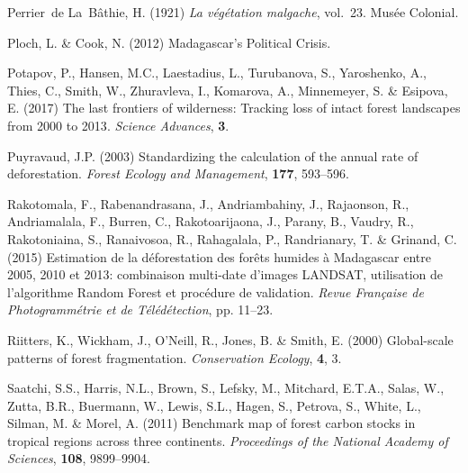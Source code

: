 \documentclass[a4paper, 12pt, leqno]{article} %
\begin{document}
\begin{thebibliography}{55}
Perrier~de La~B{\^a}thie, H. (1921) \emph{{La v{\'e}g{\'e}tation malgache}},
  vol.~23.
\newblock Mus{\'e}e Colonial.

Ploch, L. \& Cook, N. (2012) {Madagascar's Political Crisis}.

Potapov, P., Hansen, M.C., Laestadius, L., Turubanova, S., Yaroshenko, A.,
  Thies, C., Smith, W., Zhuravleva, I., Komarova, A., Minnemeyer, S. \&
  Esipova, E. (2017) {The last frontiers of wilderness: Tracking loss of intact
  forest landscapes from 2000 to 2013}.
\newblock \emph{Science Advances}, \textbf{3}.

Puyravaud, J.P. (2003) Standardizing the calculation of the annual rate of
  deforestation.
\newblock \emph{Forest Ecology and Management}, \textbf{177}, 593--596.

Rakotomala, F., Rabenandrasana, J., Andriambahiny, J., Rajaonson, R.,
  Andriamalala, F., Burren, C., Rakotoarijaona, J., Parany, B., Vaudry, R.,
  Rakotoniaina, S., Ranaivosoa, R., Rahagalala, P., Randrianary, T. \& Grinand,
  C. (2015) {Estimation de la d{\'e}forestation des for{\^e}ts humides {\`a}
  Madagascar entre 2005, 2010 et 2013: combinaison multi-date d'images LANDSAT,
  utilisation de l'algorithme Random Forest et proc{\'e}dure de validation}.
\newblock \emph{Revue Fran{\c{c}}aise de Photogramm{\'e}trie et de
  T{\'e}l{\'e}d{\'e}tection}, pp. 11--23.

Riitters, K., Wickham, J., O'Neill, R., Jones, B. \& Smith, E. (2000)
  Global-scale patterns of forest fragmentation.
\newblock \emph{Conservation Ecology}, \textbf{4}, 3.

Saatchi, S.S., Harris, N.L., Brown, S., Lefsky, M., Mitchard, E.T.A., Salas,
  W., Zutta, B.R., Buermann, W., Lewis, S.L., Hagen, S., Petrova, S., White,
  L., Silman, M. \& Morel, A. (2011) Benchmark map of forest carbon stocks in
  tropical regions across three continents.
\newblock \emph{Proceedings of the National Academy of Sciences}, \textbf{108},
  9899--9904.


\end{thebibliography}
\end{document}
